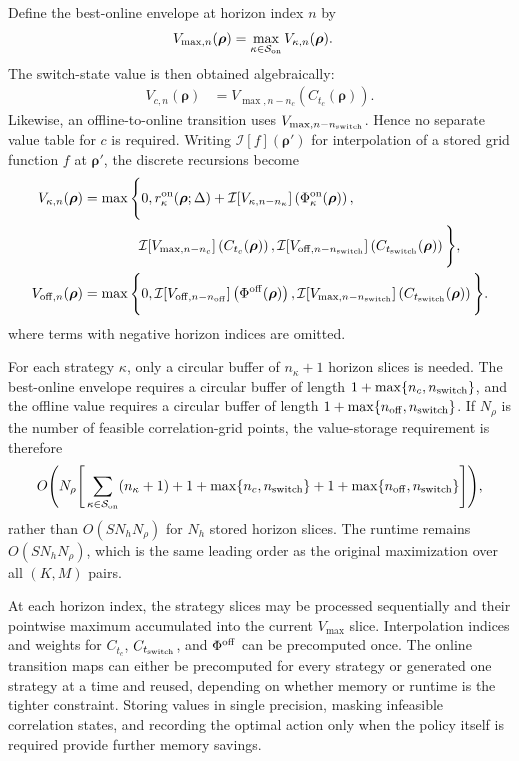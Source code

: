 \documentclass{article}
\begin{document}
Define the best-online envelope at horizon index $n$ by
\begin{align}
V_{\max,n}(\boldsymbol\rho) &= \max_{\kappa\in\mathcal S_{\rm on}}V_{\kappa,n}(\boldsymbol\rho).
\end{align}
The switch-state value is then obtained algebraically:
\begin{align}
V_{c,n}(\boldsymbol\rho) &= V_{\max,n-n_c}\left(C_{t_c}(\boldsymbol\rho)\right).
\end{align}
Likewise, an offline-to-online transition uses $V_{\max,n-n_{\rm switch}}$. Hence no separate value table for $c$ is required. Writing $\mathcal I[f](\boldsymbol\rho')$ for interpolation of a stored grid function $f$ at $\boldsymbol\rho'$, the discrete recursions become
\begin{align}
V_{\kappa,n}(\boldsymbol\rho) &= \max\Bigg\{0,r_\kappa^{\rm on}(\boldsymbol\rho;\Delta)+\mathcal I[V_{\kappa,n-n_\kappa}]\left(\Phi_\kappa^{\rm on}(\boldsymbol\rho)\right), \notag\\
&\qquad\qquad\mathcal I[V_{\max,n-n_c}]\left(C_{t_c}(\boldsymbol\rho)\right),\mathcal I[V_{{\rm off},n-n_{\rm switch}}]\left(C_{t_{\rm switch}}(\boldsymbol\rho)\right)\Bigg\}, \\
V_{{\rm off},n}(\boldsymbol\rho) &= \max\Bigg\{0,\mathcal I[V_{{\rm off},n-n_{\rm off}}]\left(\Phi^{\rm off}(\boldsymbol\rho)\right),\mathcal I[V_{\max,n-n_{\rm switch}}]\left(C_{t_{\rm switch}}(\boldsymbol\rho)\right)\Bigg\}.
\end{align}
where terms with negative horizon indices are omitted.

For each strategy $\kappa$, only a circular buffer of $n_\kappa+1$ horizon slices is needed. The best-online envelope requires a circular buffer of length $1+\max\{n_c,n_{\rm switch}\}$, and the offline value requires a circular buffer of length $1+\max\{n_{\rm off},n_{\rm switch}\}$. If $N_\rho$ is the number of feasible correlation-grid points, the value-storage requirement is therefore
\begin{align}
O\Bigg(N_\rho\Bigg[\sum_{\kappa\in\mathcal S_{\rm on}}(n_\kappa+1)+1+\max\{n_c,n_{\rm switch}\}+1+\max\{n_{\rm off},n_{\rm switch}\}\Bigg]\Bigg),
\end{align}
rather than $O(SN_hN_\rho)$ for $N_h$ stored horizon slices. The runtime remains $O(SN_hN_\rho)$, which is the same leading order as the original maximization over all $(K,M)$ pairs.

At each horizon index, the strategy slices may be processed sequentially and their pointwise maximum accumulated into the current $V_{\max}$ slice. Interpolation indices and weights for $C_{t_c}$, $C_{t_{\rm switch}}$, and $\Phi^{\rm off}$ can be precomputed once. The online transition maps can either be precomputed for every strategy or generated one strategy at a time and reused, depending on whether memory or runtime is the tighter constraint. Storing values in single precision, masking infeasible correlation states, and recording the optimal action only when the policy itself is required provide further memory savings.
\end{document}
